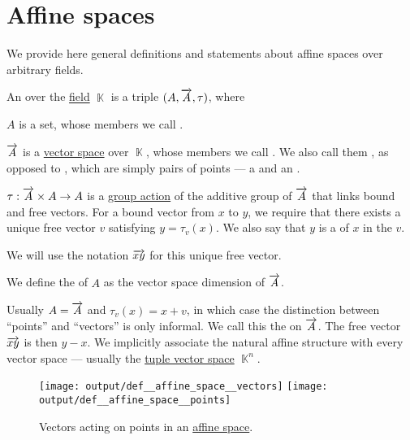 \section{Affine spaces}\label{sec:affine_spaces}

We provide here general definitions and statements about affine spaces over arbitrary fields.

\begin{definition}\label{def:affine_space}
  An  over the \hyperref[def:field]{field} \( \BbbK \) is a triple \( (A, \overrightarrow{A}, \tau) \), where
  \begin{thmenum}[series=def:affine_space]
     \( A \) is a set, whose members we call .

     \( \overrightarrow{A} \) is a \hyperref[def:vector_space]{vector space} over \( \BbbK \), whose members we call . We also call them , as opposed to , which are simply pairs of points --- a  and an .

     \( \tau: \overrightarrow{A} \times A \to A \) is a \hyperref[def:group_action]{group action} of the additive group of \( \overrightarrow{A} \) that links bound and free vectors. For a bound vector from \( x \) to \( y \), we require that there exists a unique free vector \( v \) satisfying \( y = \tau_v(x) \). We also say that \( y \) is a  of \( x \) in the  \( v \).

    We will use the notation \( \overrightarrow{xy} \) for this unique free vector.
  \end{thmenum}

  We define the  of \( A \) as the vector space dimension of \( \overrightarrow{A} \).

  Usually \( A = \overrightarrow{A} \) and \( \tau_v(x) = x + v \), in which case the distinction between \enquote{points} and \enquote{vectors} is only informal. We call this the  on \( \overrightarrow{A} \). The free vector \( \overrightarrow{xy} \) is then \( y - x \). We implicitly associate the natural affine structure with every vector space --- usually the \hyperref[def:coordinate_space]{tuple vector space} \( \BbbK^n \).

  \begin{figure}[!ht]
    \hfill
    \hfill
    \texttt{[image: output/def\_\_affine\_space\_\_vectors]}
    \hfill
    \texttt{[image: output/def\_\_affine\_space\_\_points]}
    \hfill
    \caption{Vectors acting on points in an \hyperref[def:affine_space]{affine space}.}\label{fig:def:affine_space}
  \end{figure}
\end{definition}

